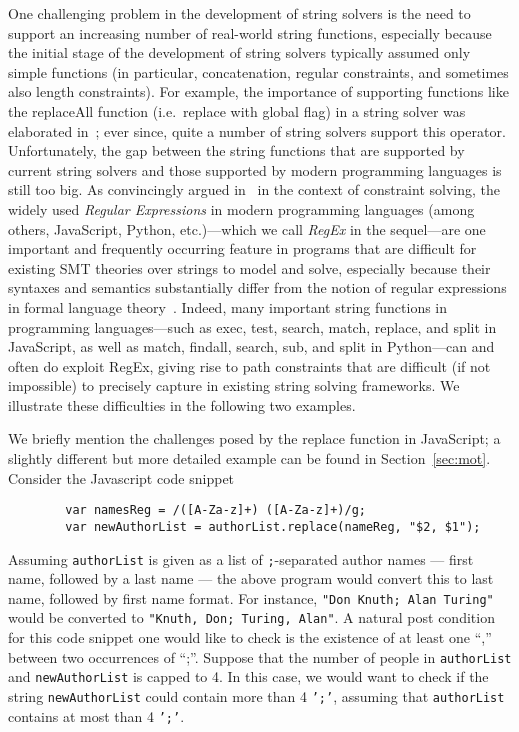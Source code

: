 One challenging problem in the development of string solvers is the need
to support an increasing number of real-world string functions, especially because the
initial stage of the development of string solvers typically assumed only simple
functions (in particular, concatenation, regular constraints, and sometimes also
length constraints). For example, the importance of supporting functions like
the replaceAll function (i.e.\ replace with global flag) in a string solver was 
elaborated in~\cite{CCH+18};
ever since, quite a number of string solvers support this operator.
Unfortunately, the gap between the string functions that are supported by 
current string solvers and those supported by modern programming languages 
is still too big. As convincingly argued in~\cite{LMK19} in the context of 
constraint solving, 
the widely used \emph{Regular Expressions} in modern programming
languages
(among others, JavaScript, Python, etc.)---which we call \emph{RegEx} 
in the sequel---are one important and frequently occurring feature in
programs that are difficult for existing SMT theories over 
strings to model and solve, especially because their syntaxes and semantics 
substantially differ from the notion of regular expressions in formal 
language theory~\cite{HU79}. Indeed,
many important string functions in programming languages---such as exec, test,
search, match, replace, and split in JavaScript, as well as match, findall,
search, sub, and split in Python---can and often do exploit RegEx, giving 
rise to path constraints that are difficult (if not impossible) to precisely 
capture in existing string solving frameworks. We illustrate these difficulties
in the following two examples.
\begin{example}\label{exmp-name-swap}
    We briefly mention the challenges posed by the replace
    function in JavaScript; a slightly different but more detailed example can be found
    in Section~\ref{sec:mot}. Consider the Javascript code snippet
    \begin{verbatim}
        var namesReg = /([A-Za-z]+) ([A-Za-z]+)/g;
        var newAuthorList = authorList.replace(nameReg, "$2, $1");
    \end{verbatim}
    Assuming \texttt{authorList} is given as a 
    list of \texttt{;}-separated author names --- first name, followed by a last name ---
    the above program would convert this to last name, followed by first name
    format. For instance, \texttt{"Don Knuth; Alan Turing"} would
    be converted to \texttt{"Knuth, Don; Turing, Alan"}.
    A natural post condition for this code snippet one would like to check is the existence of at least one ``,'' between two occurrences of ``;''.
\OMIT
{   
    Suppose that the number of people in \texttt{authorList} and 
   \texttt{newAuthorList} is capped to 4. In this case, we would want to
   check if the string \texttt{newAuthorList} could contain
   more than 4 \texttt{';'}, assuming that \texttt{authorList} contains at most
   than 4 \texttt{';'}.
}
\end{example}

